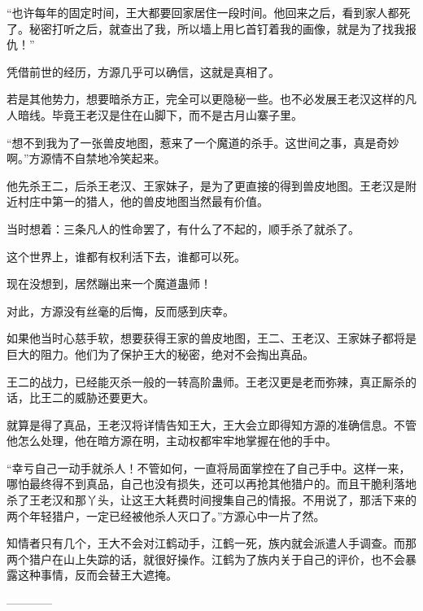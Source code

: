 \begin{this_body}
“也许每年的固定时间，王大都要回家居住一段时间。他回来之后，看到家人都死了。秘密打听之后，就查出了我，所以墙上用匕首钉着我的画像，就是为了找我报仇！”

凭借前世的经历，方源几乎可以确信，这就是真相了。

若是其他势力，想要暗杀方正，完全可以更隐秘一些。也不必发展王老汉这样的凡人暗线。毕竟王老汉是住在山脚下，而不是古月山寨子里。

“想不到我为了一张兽皮地图，惹来了一个魔道的杀手。这世间之事，真是奇妙啊。”方源情不自禁地冷笑起来。

他先杀王二，后杀王老汉、王家妹子，是为了更直接的得到兽皮地图。王老汉是附近村庄中第一的猎人，他的兽皮地图当然最有价值。

当时想着：三条凡人的性命罢了，有什么了不起的，顺手杀了就杀了。

这个世界上，谁都有权利活下去，谁都可以死。

现在没想到，居然蹦出来一个魔道蛊师！

对此，方源没有丝毫的后悔，反而感到庆幸。

如果他当时心慈手软，想要获得王家的兽皮地图，王二、王老汉、王家妹子都将是巨大的阻力。他们为了保护王大的秘密，绝对不会掏出真品。

王二的战力，已经能灭杀一般的一转高阶蛊师。王老汉更是老而弥辣，真正厮杀的话，比王二的威胁还要更大。

就算是得了真品，王老汉将详情告知王大，王大会立即得知方源的准确信息。不管他怎么处理，他在暗方源在明，主动权都牢牢地掌握在他的手中。

“幸亏自己一动手就杀人！不管如何，一直将局面掌控在了自己手中。这样一来，哪怕最终得不到真品，自己也没有损失，还可以再抢其他猎户的。而且干脆利落地杀了王老汉和那丫头，让这王大耗费时间搜集自己的情报。不用说了，那活下来的两个年轻猎户，一定已经被他杀人灭口了。”方源心中一片了然。

知情者只有几个，王大不会对江鹤动手，江鹤一死，族内就会派遣人手调查。而那两个猎户在山上失踪的话，就很好操作。江鹤为了族内关于自己的评价，也不会暴露这种事情，反而会替王大遮掩。

------------

\end{this_body}

